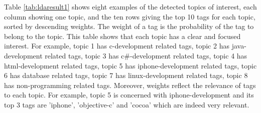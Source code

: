 Table \ref{tab:ldaresult1} shows eight examples of the detected topics of interest, each column showing one topic, and the ten rows giving the top 10 tags for each topic, sorted by descending weights. The weight of a tag is the probability of the tag to belong to the topic.  
This table shows that each topic has a clear and focused interest. For example, topic 1 has c-development related tags, topic 2 has java-development related tags, topic 3 has c\#-development related tags, topic 4 has html-development related tags, topic 5 has iphone-development related tags, topic 6 has database related tags, topic 7 has linux-development related tags, topic 8 has non-programming related tags. 
Moreover, weights reflect the relevance of tags to each topic. For example, topic 5 is concerned with iphone-development and its top 3 tags are 'iphone', 'objective-c' and 'cocoa' which are indeed very relevant.
